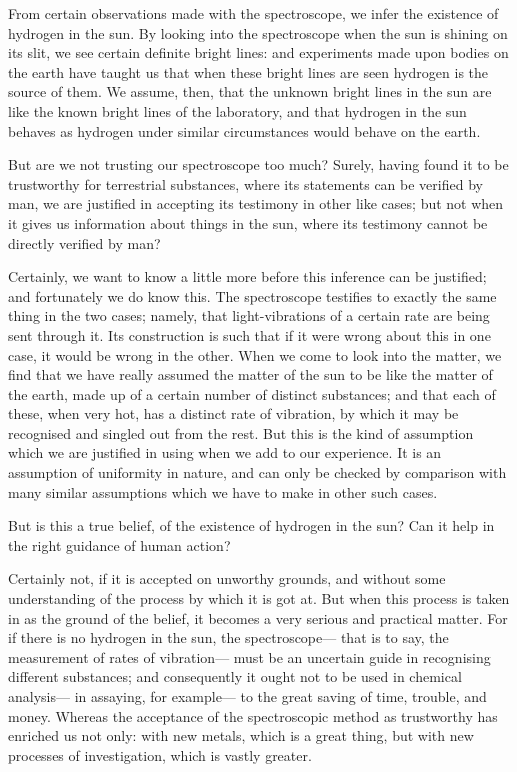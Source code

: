 \documentclass[12pt]{article}
\begin{document}
From certain observations made with the spectroscope, we infer the existence of hydrogen in the sun. By looking into the spectroscope when the sun is shining on its slit, we see certain definite bright lines: and experiments made upon bodies on the earth have taught us that when these bright lines are seen hydrogen is the source of them. We assume, then, that the unknown bright lines in the sun are like the known bright lines of the laboratory, and that hydrogen in the sun behaves as hydrogen under similar circumstances would behave on the earth.

But are we not trusting our spectroscope too much? Surely, having found it to be trustworthy for terrestrial substances, where its statements can be verified by man, we are justified in accepting its testimony in other like cases; but not when it gives us information about things in the sun, where its testimony cannot be directly verified by man?

Certainly, we want to know a little more before this inference can be justified; and fortunately we do know this. The spectroscope testifies to exactly the same thing in the two cases; namely, that light-vibrations of a certain rate are being sent through it. Its construction is such that if it were wrong about this in one case, it would be wrong in the other. When we come to look into the matter, we find that we have really assumed the matter of the sun to be like the matter of the earth, made up of a certain number of distinct substances; and that each of these, when very hot, has a distinct rate of vibration, by which it may be recognised and singled out from the rest. But this is the kind of assumption which we are justified in using when we add to our experience. It is an assumption of uniformity in nature, and can only be checked by comparison with many similar assumptions which we have to make in other such cases.

But is this a true belief, of the existence of hydrogen in the sun? Can it help in the right guidance of human action?

Certainly not, if it is accepted on unworthy grounds, and without some understanding of the process by which it is got at. But when this process is taken in as the ground of the belief, it becomes a very serious and practical matter. For if there is no hydrogen in the sun, the spectroscope--- that is to say, the measurement of rates of vibration--- must be an uncertain guide in recognising different substances; and consequently it ought not to be used in chemical analysis--- in assaying, for example--- to the great saving of time, trouble, and money. Whereas the acceptance of the spectroscopic method as trustworthy has enriched us not only: with new  metals, which is a great thing, but with new processes of investigation, which is vastly greater.
\end{document}
